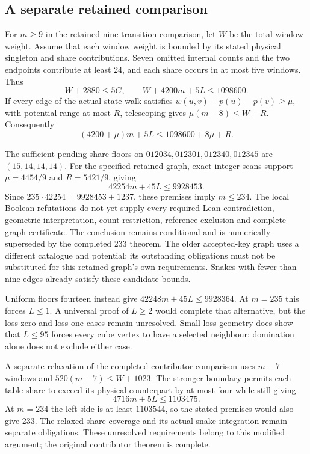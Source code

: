 \documentclass[11pt,a4paper]{article}
\begin{document}
\subsection{A separate retained comparison}
For $m\ge9$ in the retained nine-transition comparison, let $W$ be the total
window weight. Assume that each window weight is bounded by its stated
physical singleton and share contributions. Seven omitted internal
counts and the two endpoints contribute at least 24, and each share
occurs in at most five windows. Thus
\[
W+2880\le5G,\qquad W+4200m+5L\le1098600.
\]
If every edge of the actual state walk satisfies
$w(u,v)+p(u)-p(v)\ge\mu$, with potential range at most $R$, telescoping gives
$\mu(m-8)\le W+R$. Consequently
\[
\boxed{(4200+\mu)m+5L\le1098600+8\mu+R.}
\]

The sufficient pending share floors on
$012034,012301,012340,012345$ are $(15,14,14,14)$.
For the specified retained graph, exact integer scans support
$\mu=4454/9$ and $R=5421/9$, giving
\[
42254m+45L\le9928453.
\]
Since $235\cdot42254=9928453+1237$, these premises imply $m\le234$.
The local Boolean refutations do not yet supply every required Lean
contradiction, geometric interpretation, count restriction, reference
exclusion and complete graph certificate. The conclusion remains
conditional and is numerically superseded by the completed 233 theorem.
The older accepted-key graph uses a different catalogue
and potential; its outstanding obligations must not be substituted
for this retained graph's own requirements.
Snakes with fewer than nine edges already satisfy these candidate bounds.

Uniform floors fourteen instead give
$42248m+45L\le9928364$. At $m=235$ this forces $L\le1$.
A universal proof of $L\ge2$ would complete that alternative, but the
loss-zero and loss-one cases remain unresolved. Small-loss geometry
does show that $L\le95$ forces every cube vertex to have a selected
neighbour; domination alone does not exclude either case.

A separate relaxation of the completed contributor comparison uses
$m-7$ windows and
$520(m-7)\le W+1023$. The stronger boundary permits each table share
to exceed its physical counterpart by at most four while still giving
\[
4716m+5L\le1103475.
\]
At $m=234$ the left side is at least $1103544$, so the stated premises
would also give 233. The relaxed share coverage and its actual-snake
integration remain separate obligations. These unresolved requirements
belong to this modified argument; the original contributor theorem is complete.
\end{document}
